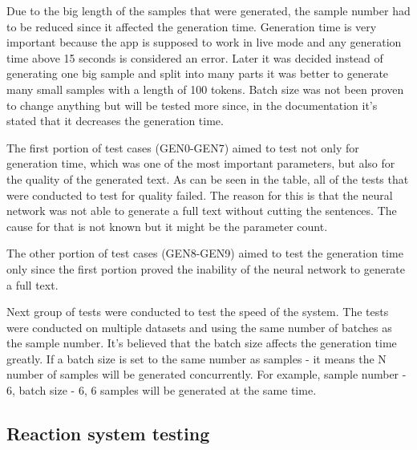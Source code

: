 \documentclass[12pt]{report}
\begin{document}
\begin{appendices}
Due to the big length of the samples that were generated, the sample number had to be reduced since it affected the
generation time. Generation time is very important because the app is supposed to work in live mode and any generation
time above 15 seconds is considered an error. Later it was decided instead of generating one big sample and split into
many parts it was better to generate many small samples with a length of 100 tokens. Batch size was not been proven to
change anything but will be tested more since, in the documentation it's stated that it decreases the generation time.

The first portion of test cases (GEN0-GEN7) aimed to test not only for generation time, which was one of the most
important parameters, but also for the quality of the generated text. As can be seen in the table, all of the tests
that were conducted to test for quality failed. The reason for this is that the neural network was not able to generate
a full text without cutting the sentences. The cause for that is not known but it might be the parameter count.

The other portion of test cases (GEN8-GEN9) aimed to test the generation time only since the first portion proved
the inability of the neural network to generate a full text.

Next group of tests were conducted to test the speed of the system. The tests were conducted on multiple datasets and
using the same number of batches as the sample number. It's believed that the batch size affects the generation time
greatly. If a batch size is set to the same number as samples - it means the N number of samples will be generated
concurrently. For example, sample number - 6, batch size - 6, 6 samples will be generated at the same time.


\clearpage

\subsection*{Reaction system testing}
\label{appendix:reaction_system_testing}


\end{appendices}
\end{document}
